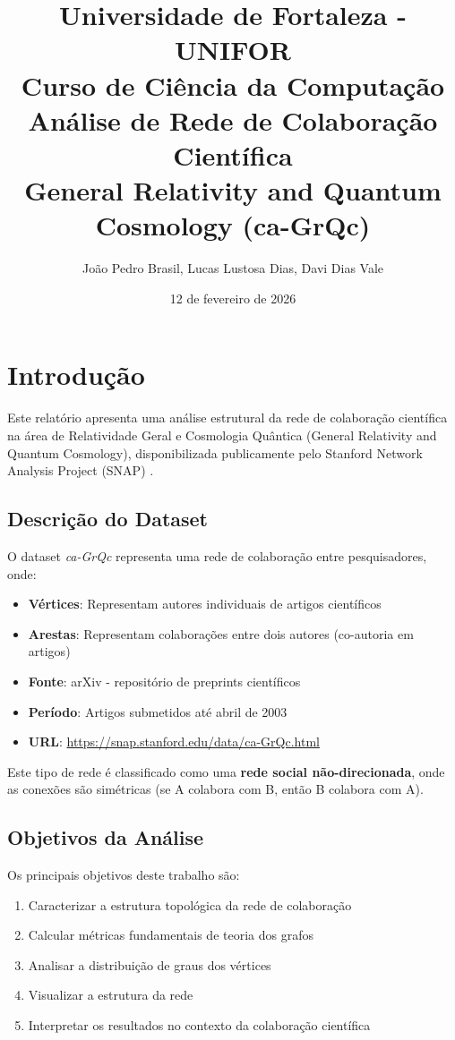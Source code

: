 \documentclass[12pt,a4paper]{article}
\title{
    \Large\textbf{Universidade de Fortaleza - UNIFOR}\\
    \large Curso de Ciência da Computação\\
    \vspace{1.5cm}
    \huge\textbf{Análise de Rede de Colaboração Científica}\\
    \large General Relativity and Quantum Cosmology (ca-GrQc)
}
\author{João Pedro Brasil, Lucas Lustosa Dias, Davi Dias Vale}
\date{12 de fevereiro de 2026}
\begin{document}
\maketitle
\thispagestyle{empty}
\newpage

\tableofcontents
\newpage

\section{Introdução}

Este relatório apresenta uma análise estrutural da rede de colaboração científica na área de Relatividade Geral e Cosmologia Quântica (General Relativity and Quantum Cosmology), disponibilizada publicamente pelo Stanford Network Analysis Project (SNAP) \cite{snapnets}.

\subsection{Descrição do Dataset}

O dataset \textit{ca-GrQc} representa uma rede de colaboração entre pesquisadores, onde:

\begin{itemize}
    \item \textbf{Vértices}: Representam autores individuais de artigos científicos
    \item \textbf{Arestas}: Representam colaborações entre dois autores (co-autoria em artigos)
    \item \textbf{Fonte}: arXiv - repositório de preprints científicos
    \item \textbf{Período}: Artigos submetidos até abril de 2003
    \item \textbf{URL}: \url{https://snap.stanford.edu/data/ca-GrQc.html}
\end{itemize}

Este tipo de rede é classificado como uma \textbf{rede social não-direcionada}, onde as conexões são simétricas (se A colabora com B, então B colabora com A).

\subsection{Objetivos da Análise}

Os principais objetivos deste trabalho são:

\begin{enumerate}
    \item Caracterizar a estrutura topológica da rede de colaboração
    \item Calcular métricas fundamentais de teoria dos grafos
    \item Analisar a distribuição de graus dos vértices
    \item Visualizar a estrutura da rede
    \item Interpretar os resultados no contexto da colaboração científica
\end{enumerate}
\end{document}

